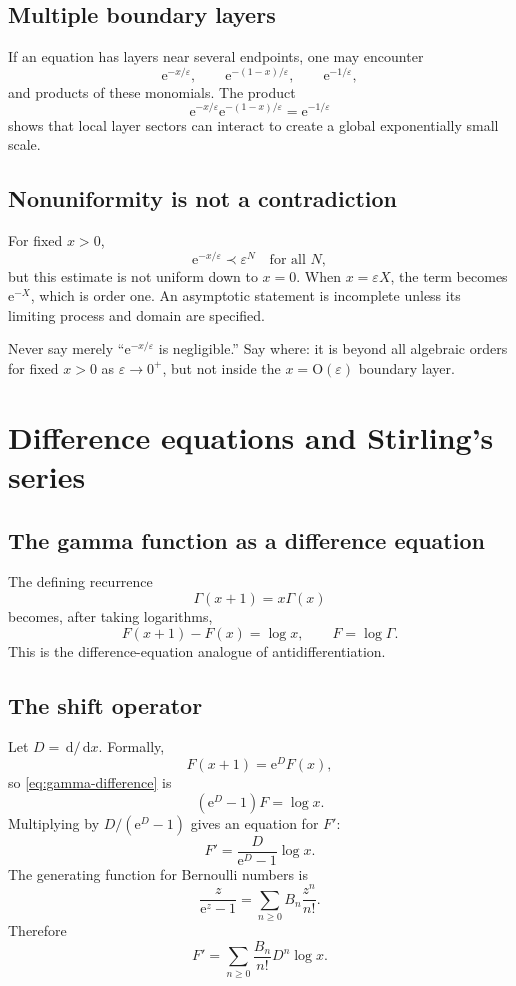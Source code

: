 \documentclass[11pt,openany]{book}
\theoremstyle{plain}
\theoremstyle{definition}
\theoremstyle{remark}
\newcommand{\bigO}{\mathrm{O}}
\newcommand{\dd}{\,\mathrm{d}}
\newcommand{\e}{\mathrm{e}}
\begin{document}
\section{Multiple boundary layers}
If an equation has layers near several endpoints, one may encounter
\[
  \e^{-x/\varepsilon},
  \qquad
  \e^{-(1-x)/\varepsilon},
  \qquad
  \e^{-1/\varepsilon},
\]
and products of these monomials. The product
\[
  \e^{-x/\varepsilon}\e^{-(1-x)/\varepsilon}
  =\e^{-1/\varepsilon}
\]
shows that local layer sectors can interact to create a global exponentially small scale.

\section{Nonuniformity is not a contradiction}
For fixed $x>0$,
\[
  \e^{-x/\varepsilon}\prec\varepsilon^N
  \quad\text{for all }N,
\]
but this estimate is not uniform down to $x=0$. When $x=\varepsilon X$, the term becomes $\e^{-X}$, which is order one. An asymptotic statement is incomplete unless its limiting process and domain are specified.

\begin{warningbox}
Never say merely ``$\e^{-x/\varepsilon}$ is negligible.'' Say where: it is beyond all algebraic orders for fixed $x>0$ as $\varepsilon\to0^+$, but not inside the $x=\bigO(\varepsilon)$ boundary layer.
\end{warningbox}

\chapter{Difference equations and Stirling's series}
\label{chap:difference}

\section{The gamma function as a difference equation}
The defining recurrence
\[
  \Gamma(x+1)=x\Gamma(x)
\]
becomes, after taking logarithms,
\[
  F(x+1)-F(x)=\log x,
  \qquad F=\log\Gamma.
  \label{eq:gamma-difference}
\]
This is the difference-equation analogue of antidifferentiation.

\section{The shift operator}
Let $D=\dd/\dd x$. Formally,
\[
  F(x+1)=\e^D F(x),
\]
so \cref{eq:gamma-difference} is
\[
  (\e^D-1)F=\log x.
\]
Multiplying by $D/(\e^D-1)$ gives an equation for $F'$:
\[
  F'=\frac{D}{\e^D-1}\log x.
\]
The generating function for Bernoulli numbers is
\[
  \frac{z}{\e^z-1}
  =\sum_{n\ge0}B_n\frac{z^n}{n!}.
\]
Therefore
\[
  F'=\sum_{n\ge0}\frac{B_n}{n!}D^n\log x.
\]
\end{document}

